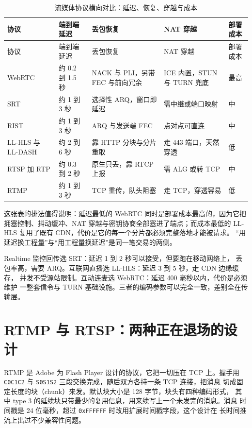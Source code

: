 \documentclass[12pt,a4paper,fontset=fandol]{ctexbook}
\newcommand{\Tp}[1]{\texttt{#1}}
\newcommand{\Lang}[1]{\textsf{#1}}
\newcommand{\DomRT}{\Lang{Realtime}}
\begin{document}
\begin{longtable}{>{\raggedright\arraybackslash}p{}
                 >{\raggedright\arraybackslash}p{}
                 >{\raggedright\arraybackslash}p{}
                 >{\raggedright\arraybackslash}p{}
                 >{\raggedright\arraybackslash}p{}}
\caption{流媒体协议横向对比：延迟、恢复、穿越与成本}\label{tab:ch11-protocol-map} \\
\toprule
协议 & 端到端延迟 & 丢包恢复 & NAT 穿越 & 部署成本 \\ \midrule
\endfirsthead
\toprule
协议 & 端到端延迟 & 丢包恢复 & NAT 穿越 & 部署成本 \\ \midrule
\endhead
\bottomrule
\endfoot
WebRTC & 约 0.2 到 1.5 秒 & NACK 与 PLI，另带 FEC 与前向冗余 & ICE 内置，STUN 与 TURN 兜底 & 最高 \\
SRT & 约 1 到 3 秒 & 选择性 ARQ，窗口即延迟 & 需中继或端口映射 & 中 \\
RIST & 约 1 到 3 秒 & ARQ 与发送端 FEC & 点对点可直连 & 中 \\
LL-HLS 与 LL-DASH & 约 2 到 6 秒 & 靠 HTTP 分块与分片重取 & 走 443 端口，天然穿透 & 低 \\
RTSP 加 RTP & 约 0.3 到 2 秒 & 原生只丢，靠 RTCP 上报 & 需 ALG 或转 TCP & 中 \\
RTMP & 约 1 到 3 秒 & TCP 重传，队头阻塞 & 走 TCP，穿透容易 & 低 \\
\end{longtable}

这张表的排法值得说明：延迟最低的 WebRTC 同时是部署成本最高的，因为它把
拥塞控制、抖动缓冲、NAT 穿越与密钥协商全部塞进了端点；而成本最低的
LL-HLS 复用了既有 CDN，代价是它的每一个分片都必须完整落地才能被请求。
``用延迟换工程量''与``用工程量换延迟''是同一笔交易的两侧。

\begin{compare}[title={三种典型链路的延迟构成}]
\DomRT{} 监控回传选 SRT：延迟 1 到 2 秒可以接受，但要跑在移动网络上，
丢包率高，需要 ARQ。互联网直播选 LL-HLS：延迟 3 到 5 秒，走 CDN 边缘缓存，
并发不受源站限制。互动连麦选 WebRTC：延迟 400 毫秒以内，代价是必须维护
一整套信令与 TURN 基础设施。三者的编码参数可以完全一致，差别全在传输层。
\end{compare}

\section{RTMP 与 RTSP：两种正在退场的设计}

RTMP 是 Adobe 为 Flash Player 设计的协议，它把一切压在 TCP 上。握手用
\Tp{C0C1C2} 与 \Tp{S0S1S2} 三段交换完成，随后双方各持一条 TCP 连接，把消息
切成固定长度的块（chunk）来发。默认块大小是 128 字节，块头有四种编码形式，
其中 type 3 的延续块只带最少的复用信息，用来续写上一个未发完的消息。消息
时间戳是 24 位毫秒，超过 \Tp{0xFFFFFF} 时改用扩展时间戳字段，这个设计在
长时间推流上出过不少兼容性问题。
\end{document}
